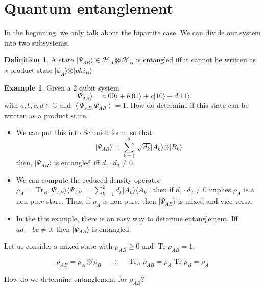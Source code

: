 \documentclass[12pt]{book}
\theoremstyle{definition}
\newtheorem*{defi}{\bfseries Definition}
\newtheorem*{example}{\bfseries Example}
\newcommand{\C}{\mathbb C}
\newcommand{\scalar}[1]{\left\langle {#1}\right\rangle}
\let\oldsum\sum
\renewcommand{\sum}[2]{\oldsum\limits_{#1}^{#2}}
\renewcommand{\to}{\longrightarrow}
\newcommand{\bra}[1]{\langle {#1} \vert}
\newcommand{\ket}[1]{\vert {#1} \rangle}
\DeclareMathOperator{\tr}{Tr}
\begin{document}
\section{Quantum entanglement}
In the beginning, we only talk about the bipartite case. We can divide our system into two subsystems.
\begin{defi}
A state $\ket{\Psi_{AB}} \in \mathcal H_A \otimes \mathcal H_B$ is entangled iff it cannot be written as a product state $\ket{\phi_A}\otimes\ket{phi_B}$
\end{defi}
\begin{example}
  Given a 2 qubit system
  \begin{equation*}
    \ket{\Psi_{AB}} = a \ket{00} + b \ket{01} + c \ket{10} + d \ket{11}
  \end{equation*}
  with $a,b,c,d \in \C$ and $\scalar{\Psi_{AB} \vert \Psi_{AB}} = 1$. How do determine if this state can be written as a product state.
  \begin{itemize}
    \item We can put this into Schmidt form, so that:
    \begin{equation*}
      \ket{\Psi_{AB}} = \sum{k=1}{2}\sqrt{d_k} \ket{A_k} \otimes \ket{B_k}
    \end{equation*}
    then, $\ket{\Psi_{AB}}$ is entangled iff $d_1\cdot d_2 \neq 0$.
    \item We can compute the reduced density operator $\rho_A = \tr_B \ket{\Psi_{AB}}\bra{\Psi_{AB}} = \sum{k=1}{2} d_k \ket{A_k} \bra{A_k}$, then if $d_1 \cdot d_2 \neq 0$ implies $\rho_A$ is a non-pure stare. Thus, if $\rho_A$ is non-pure, then $\ket{\Psi_{AB}}$ is mixed and vice versa.
    \item In the this example, there is an easy way to deterime entanglement. Iff $ad-bc \neq 0$, then $\ket{\Psi_{AB}}$ is entangled.
  \end{itemize}
\end{example}

Let us consider a mixed state with $\rho_{AB} \geq 0$ and $\tr \rho_{AB} = 1$.
\begin{tcolorbox}
  \begin{equation}
    \rho_{AB} = \rho_A \otimes \rho_B \quad\to\quad \tr_B \rho_{AB} = \rho_A \tr \rho_B = \rho_A
  \end{equation}
\end{tcolorbox}
How do we determine entanglement for $\rho_{AB}$?
\end{document}
